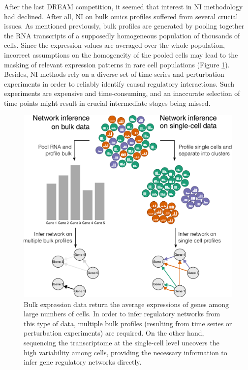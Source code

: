 After the last DREAM competition, it seemed that interest in NI methodology had declined. After all, NI on bulk omics profiles suffered from several crucial issues. As mentioned previously, bulk profiles are generated by pooling together the RNA transcripts of a supposedly homogeneous population of thousands of cells. Since the expression values are averaged over the whole population, incorrect assumptions on the homogeneity of the pooled cells may lead to the masking of relevant expression patterns in rare cell populations (Figure \ref{fig:bulk_vs_singlecell}). Besides, NI methods rely on a diverse set of time-series and perturbation experiments in order to reliably identify causal regulatory interactions. Such experiments are expensive and time-consuming, and an inaccurate selection of time points might result in crucial intermediate stages being missed.

\begin{figure}[htb!]
  \centering
  \includegraphics[width=\Largefigure]{fig/ni_bulk_vs_sc}
  \caption{Bulk expression data return the average expressions of genes among large numbers of cells. In order to infer regulatory networks from this type of data, multiple bulk profiles (resulting from time series or perturbation experiments) are required. On the other hand, sequencing the transcriptome at the single-cell level uncovers the high variability among cells, providing the necessary information to infer gene regulatory networks directly.} %
  \label{fig:bulk_vs_singlecell}
\end{figure}


